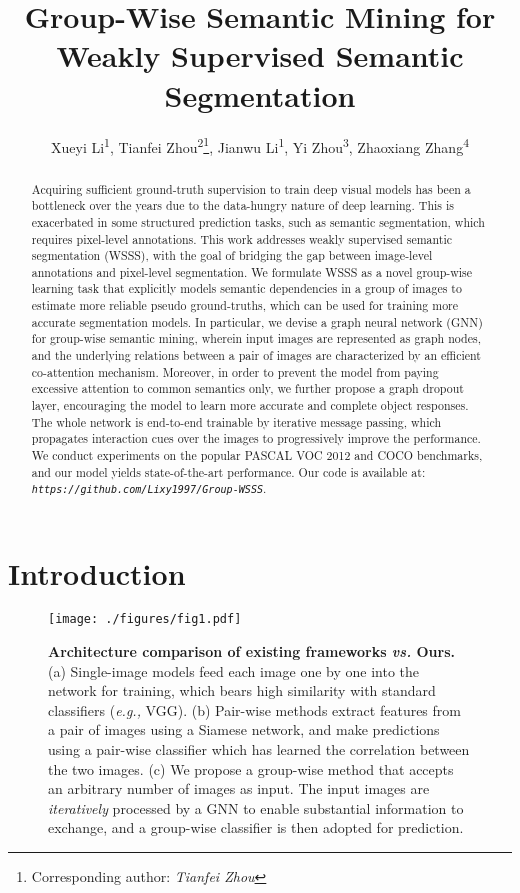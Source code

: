 \documentclass[letterpaper]{article} \usepackage{aaai21}  \usepackage{times}  \usepackage{helvet} \usepackage{courier}  \usepackage[hyphens]{url}  \usepackage{graphicx} \urlstyle{rm} \def\UrlFont{\rm}  \usepackage{graphicx}  \usepackage{natbib}  \usepackage{caption} \frenchspacing  \setlength{\pdfpagewidth}{8.5in}  \setlength{\pdfpageheight}{11in}
\title{Group-Wise Semantic Mining for Weakly Supervised Semantic Segmentation}
\author{Xueyi Li\textsuperscript{\rm 1}, 
		Tianfei Zhou\textsuperscript{\rm 2}\thanks{Corresponding author: \textit{Tianfei Zhou}}, 
		Jianwu Li\textsuperscript{\rm 1},
		Yi Zhou\textsuperscript{\rm 3},
		Zhaoxiang Zhang\textsuperscript{\rm 4} \\
		}
\newcommand{\eg}[1]{\textit{e.g.,}}
\begin{document}
\maketitle

\begin{abstract}
	
	Acquiring sufficient ground-truth supervision to train deep visual models has been a bottleneck over the years due to the data-hungry nature of deep learning. This is exacerbated in some structured prediction tasks, such as semantic segmentation, which requires pixel-level annotations. This work addresses weakly supervised semantic segmentation (WSSS), with the goal of bridging the gap between image-level annotations and pixel-level segmentation. We formulate WSSS as a novel group-wise learning task that explicitly models semantic dependencies in a group of images to estimate more reliable pseudo ground-truths, which can be used for training more accurate segmentation models. In particular, we devise a graph neural network (GNN) for group-wise semantic mining, wherein input images are represented as graph nodes, and the underlying relations between a pair of images are characterized by an efficient co-attention mechanism. Moreover, in order to prevent the model from paying excessive attention to common semantics only, we further propose a graph dropout layer, encouraging the model to learn more accurate and complete object responses. The whole network is end-to-end trainable by iterative message passing, which propagates interaction cues over the images to progressively improve the performance. We conduct experiments on the popular PASCAL VOC 2012 and COCO benchmarks, and our model yields state-of-the-art performance. Our code is available at: \textit{\texttt{https://github.com/Lixy1997/Group-WSSS}}.
\end{abstract}
\section{Introduction}



\begin{figure*}[!t]
	\centering
	\texttt{[image: ./figures/fig1.pdf]}
	\caption{\small\textbf{Architecture comparison of existing frameworks \textit{vs.} Ours.} (a) Single-image models feed each image one by one into the network for training, which bears high similarity with standard classifiers (\eg, VGG). (b) Pair-wise methods extract features from a pair of images using a Siamese network, and make predictions using a pair-wise classifier which has learned the correlation between the two images. (c) We propose a group-wise method that accepts an arbitrary number of images as input. The input images are \textit{iteratively} processed by a GNN to enable substantial information to exchange, and a group-wise classifier is then adopted for prediction.}
	\label{fig:1}
\end{figure*}
\end{document}
